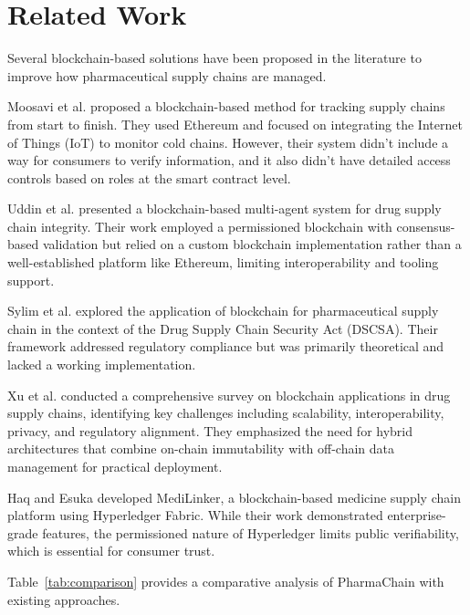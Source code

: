 \documentclass[conference]{IEEEtran}
\begin{document}
\section{Related Work}

Several blockchain-based solutions have been proposed in the literature to improve how pharmaceutical supply chains are managed.

Moosavi et al. \cite{b5} proposed a blockchain-based method for tracking supply chains from start to finish. They used Ethereum and focused on integrating the Internet of Things (IoT) to monitor cold chains. However, their system didn't include a way for consumers to verify information, and it also didn't have detailed access controls based on roles at the smart contract level.

Uddin et al. \cite{b6} presented a blockchain-based multi-agent system for drug supply chain integrity. Their work employed a permissioned blockchain with consensus-based validation but relied on a custom blockchain implementation rather than a well-established platform like Ethereum, limiting interoperability and tooling support.

Sylim et al. \cite{b7} explored the application of blockchain for pharmaceutical supply chain in the context of the Drug Supply Chain Security Act (DSCSA). Their framework addressed regulatory compliance but was primarily theoretical and lacked a working implementation.

Xu et al. \cite{b8} conducted a comprehensive survey on blockchain applications in drug supply chains, identifying key challenges including scalability, interoperability, privacy, and regulatory alignment. They emphasized the need for hybrid architectures that combine on-chain immutability with off-chain data management for practical deployment.

Haq and Esuka \cite{b9} developed MediLinker, a blockchain-based medicine supply chain platform using Hyperledger Fabric. While their work demonstrated enterprise-grade features, the permissioned nature of Hyperledger limits public verifiability, which is essential for consumer trust.

Table~\ref{tab:comparison} provides a comparative analysis of PharmaChain with existing approaches.
\end{document}
